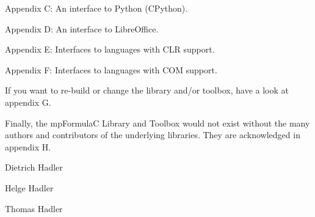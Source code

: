\vpara
Appendix C:  An interface to Python (CPython).

\vpara
Appendix D:  An interface to LibreOffice.

\vpara
Appendix E:  Interfaces to languages with CLR support.

\vpara
Appendix F:  Interfaces to languages with COM support.


\vpara
If you want to re-build or change the library and/or toolbox, have a look at appendix G.

\vpara
Finally, the mpFormulaC Library and Toolbox would not exist without the many authors and contributors of the underlying libraries. They are acknowledged in appendix H.


\vspace{0.6cm}
Dietrich Hadler

Helge Hadler

Thomas Hadler

